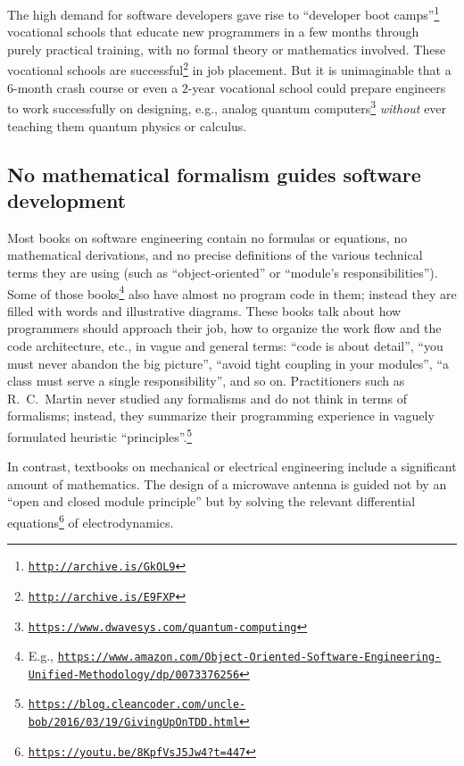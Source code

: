 The high demand for software developers gave rise to \textsf{``}developer
boot camps\textsf{''}\footnote{\texttt{\href{http://archive.is/GkOL9}{http://archive.is/GkOL9}}}
\textemdash{} vocational schools that educate new programmers in a
few months through purely practical training, with no formal theory
or mathematics involved. These vocational schools are successful\footnote{\texttt{\href{http://archive.is/E9FXP}{http://archive.is/E9FXP}}}
in job placement. But it is unimaginable that a $6$-month crash course
or even a $2$-year vocational school could prepare engineers to work
successfully on designing, e.g., analog quantum computers\footnote{\texttt{\href{https://www.dwavesys.com/quantum-computing}{https://www.dwavesys.com/quantum-computing}}}
\emph{without} ever teaching them quantum physics or calculus.

\subsection{No mathematical formalism guides software development}

Most books on software engineering contain no formulas or equations,
no mathematical derivations, and no precise definitions of the various
technical terms they are using (such as \textsf{``}object-oriented\textsf{''} or \textsf{``}module\textsf{'}s
responsibilities\textsf{''}). Some of those books\footnote{E.g., \texttt{\href{https://www.amazon.com/Object-Oriented-Software-Engineering-Unified-Methodology/dp/0073376256}{https://www.amazon.com/Object-Oriented-Software-Engineering-Unified-Methodology/dp/0073376256}}}
also have almost no program code in them; instead they are filled
with words and illustrative diagrams. These books talk about how programmers
should approach their job, how to organize the work flow and the code
architecture, etc., in vague and general terms: \textsf{``}code is about detail\textsf{''},
\textsf{``}you must never abandon the big picture\textsf{''}, \textsf{``}avoid tight coupling
in your modules\textsf{''}, \textsf{``}a class must serve a single responsibility\textsf{''},
and so on. Practitioners such as R.\ C.\ Martin never studied any
formalisms and do not think in terms of formalisms; instead, they
summarize their programming experience in vaguely formulated heuristic
\textquotedblleft principles\textquotedblright .\footnote{\texttt{\href{https://blog.cleancoder.com/uncle-bob/2016/03/19/GivingUpOnTDD.html}{https://blog.cleancoder.com/uncle-bob/2016/03/19/GivingUpOnTDD.html}}}

In contrast, textbooks on mechanical or electrical engineering include
a significant amount of mathematics. The design of a microwave antenna
is guided not by an \textsf{``}open and closed module principle\textsf{''} but by
solving the relevant differential equations\footnote{\texttt{\href{https://youtu.be/8KpfVsJ5Jw4?t=447}{https://youtu.be/8KpfVsJ5Jw4?t=447}}}
of electrodynamics.

